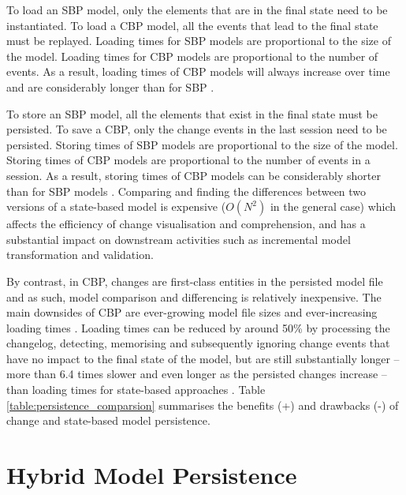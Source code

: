 \documentclass{llncs}
\begin{document}
To load an SBP model, only the elements that are in the final state need to be instantiated. To load a CBP model, all the events that lead to the final state must be replayed. Loading times for SBP models are proportional to the size of the model. Loading times for CBP models are proportional to the number of events. As a result, loading times of CBP models will always increase over time and are considerably longer than for SBP \cite{yohannis2018towards,mens2002state}. 

To store an SBP model, all the elements that exist in the final state must be persisted. To save a CBP, only the change events in the last session need to be persisted. Storing times of SBP models are proportional to the size of the model. Storing times of CBP models are proportional to the number of events in a session. As a result, storing times of CBP models can be considerably shorter than for SBP models \cite{yohannis2018towards}. Comparing and finding the differences between two versions of a state-based model is expensive \cite{Kolovos:2009:DMM:1564596.1564641} ($O(N^2)$ in the general case) which affects the efficiency of change visualisation and comprehension, and has a substantial impact on downstream activities such as incremental model transformation \cite{DBLP:conf/ecmdafa/OgunyomiRK15} and validation.

By contrast, in CBP, changes are first-class entities in the persisted model file and as such, model comparison and differencing is relatively inexpensive. The main downsides of CBP are ever-growing model file sizes \cite{DBLP:journals/entcs/RobbesL07,DBLP:conf/edoc/KoegelHLHD10} and ever-increasing loading times \cite{mens2002state}. Loading times can be reduced by around 50\% by processing the changelog, detecting, memorising and subsequently ignoring change events that have no impact to the final state of the model, but are still substantially longer -- more than 6.4 times slower and even longer as the persisted changes increase -- than loading times for state-based approaches \cite{yohannis2018towards}. Table \ref{table:persistence_comparsion} summarises the benefits (+) and drawbacks (-) of change and state-based model persistence.

\vspace{-15pt}
\section{Hybrid Model Persistence}
\label{sec:hybrid_model_persistence}
\end{document}
